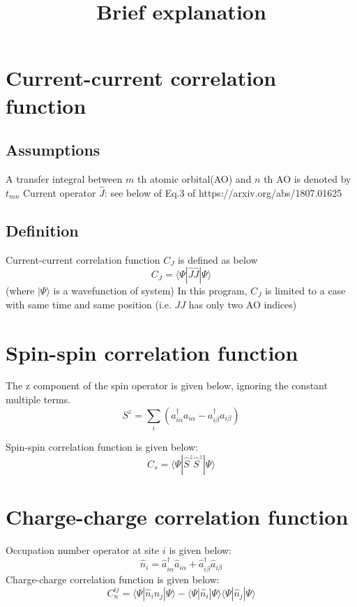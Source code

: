 \documentclass{article}
\begin{document}
\title{Brief explanation}
\maketitle


\section{Current-current correlation function}
\subsection{Assumptions}

A transfer integral between $m$ th atomic orbital(AO) and $n$ th AO is denoted by $t_{mn}$
Current operator $\hat{J}$: see below of Eq.3 of https://arxiv.org/abs/1807.01625

\subsection{Definition}
Current-current correlation function $C_{J}$ is defined as below
\begin{equation}
C_{J} = \langle \Psi | \hat{J}\hat{J} | \Psi \rangle
\end{equation}
(where $|\Psi\rangle$ is a wavefunction of system)
In this program, $C_{J}$ is limited to a case with same time and same position (i.e. $JJ$ has only two AO indices)

\section{Spin-spin correlation function}
The z component of the spin operator is given below, ignoring the constant multiple terms.
\begin{equation}
    S^{z} = \sum_{i} (a^{\dagger}_{i\alpha}a_{i\alpha} - a^{\dagger}_{i\beta}a_{i\beta})
\end{equation}

Spin-spin correlation function is given below:
\begin{equation}
C_{s} = \langle \Psi | \hat{S}^{z}\hat{S}^{z} | \Psi \rangle
\end{equation}

\section{Charge-charge correlation function}
Occupation number operator at site $i$ is given below:
\begin{equation}
\hat{n}_{i} = \hat{a}^{\dagger}_{i\alpha}\hat{a}_{i\alpha} + \hat{a}^{\dagger}_{i\beta}\hat{a}_{i\beta}
\end{equation}
Charge-charge correlation function is given below:
\begin{equation}
C_{n}^{ij} = \langle \Psi | \hat{n}_{i}\hat{n}_{j} | \Psi \rangle
- \langle \Psi | \hat{n}_{i} | \Psi \rangle
\langle \Psi | \hat{n}_{j} | \Psi \rangle
\end{equation}
\end{document}

